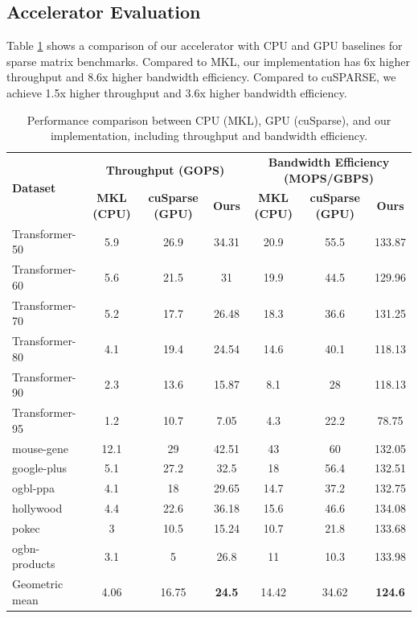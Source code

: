 \documentclass[manuscript,screen,review]{acmart}
\begin{document}
\subsection{Accelerator Evaluation}
Table \ref{cpu-gpu} shows a comparison of our accelerator with CPU and GPU baselines for sparse matrix benchmarks. Compared to MKL, our implementation has 6x higher throughput and 8.6x higher bandwidth efficiency. Compared to cuSPARSE, we achieve 1.5x higher throughput and 3.6x higher bandwidth efficiency. 

\begin{table}[h!]
	\centering
	\begin{tabular}{|l|c|c|c|c|c|c|}
		\hline
		\multirow{2}{*}{\textbf{Dataset}} & \multicolumn{3}{c|}{\textbf{Throughput (GOPS)}} & \multicolumn{3}{c|}{\textbf{Bandwidth Efficiency (MOPS/GBPS)}} \\
		\cline{2-7}
		& \textbf{MKL (CPU)} & \textbf{cuSparse (GPU)} & \textbf{Ours} & \textbf{MKL (CPU)} & \textbf{cuSparse (GPU)} & \textbf{Ours} \\
		\hline
		Transformer-50 & 5.9 & 26.9 & 34.31 & 20.9 & 55.5 & 133.87 \\		
		Transformer-60 & 5.6 & 21.5 & 31 & 19.9 & 44.5 & 129.96 \\				
		Transformer-70 & 5.2 & 17.7 & 26.48 & 18.3 & 36.6 & 131.25 \\		
		Transformer-80 & 4.1 & 19.4  & 24.54 & 14.6  & 40.1  & 118.13 \\
		Transformer-90 & 2.3 & 13.6 & 15.87 & 8.1 & 28 & 118.13 \\				
		Transformer-95 & 1.2 & 10.7 & 7.05 & 4.3 & 22.2 & 78.75 \\
		mouse-gene & 12.1 & 29 & 42.51 & 43 & 60 & 132.05 \\
		google-plus & 5.1 & 27.2 & 32.5 & 18 & 56.4 & 132.51 \\
		ogbl-ppa & 4.1 & 18 & 29.65 & 14.7 & 37.2 & 132.75 \\
		hollywood & 4.4 & 22.6 & 36.18 & 15.6 & 46.6 & 134.08 \\		
		pokec & 3 & 10.5 & 15.24 & 10.7 & 21.8 & 133.68 \\		
		ogbn-products & 3.1 & 5 & 26.8 & 11 & 10.3 & 133.98 \\						
		\hline
		
		Geometric mean & 4.06 & 16.75 & \textbf{24.5} & 14.42 & 34.62 & \textbf{124.6} \\
		\hline
	\end{tabular}
	\caption{Performance comparison between CPU (MKL), GPU (cuSparse), and our implementation, including throughput and bandwidth efficiency.}
	\label{cpu-gpu}
\end{table}
\end{document}
